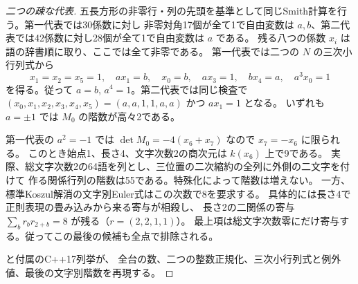 \begin{proof}[二つの疎な代表]
五長方形の非零行・列の先頭を基準として同じSmith計算を行う。第一代表では30係数に対し
非零対角17個が全て1で自由変数は $a,b$、第二代表では42係数に対し28個が全て1で自由変数は $a$ である。
残る八つの係数 $x_i$ は語の辞書順に取り、ここでは全て非零である。
第一代表では二つの $N$ の三次小行列式から
\[
 x_1=x_2=x_5=1,\quad ax_1=b,\quad x_0=b,\quad ax_3=1,\quad
 bx_4=a,\quad a^3x_0=1
\]
を得る。従って $a=b$, $a^4=1$。第二代表では同じ検査で
$(x_0,x_1,x_2,x_3,x_4,x_5)=(a,a,1,1,a,a)$ かつ $ax_1=1$ となる。
いずれも $a=\pm1$ では $M_0$ の階数が高々2である。

第一代表の $a^2=-1$ では $\det M_0=-4(x_6+x_7)$ なので $x_7=-x_6$ に限られる。
このとき始点1、長さ4、文字次数2の商次元は $k(x_6)$ 上で9である。
実際、総文字次数2の64語を列とし、三位置の二次縮約の全列に外側の二文字を付けて
作る関係行列の階数は55である。特殊化によって階数は増えない。
一方、標準Koszul解消の文字別Euler式はこの次数で8を要求する。
具体的には長さ4で正則表現の畳み込みから来る寄与が相殺し、
長さ2の二関係の寄与 $\sum_b r_b r_{2+b}=8$ が残る（$r=(2,2,1,1)$）。
最上項は総文字次数零にだけ寄与する。従ってこの最後の候補も全点で排除される。

 と付属のC++17列挙が、
全台の数、二つの整数正規化、三次小行列式と例外値、最後の文字別階数を再現する。
\end{proof}
